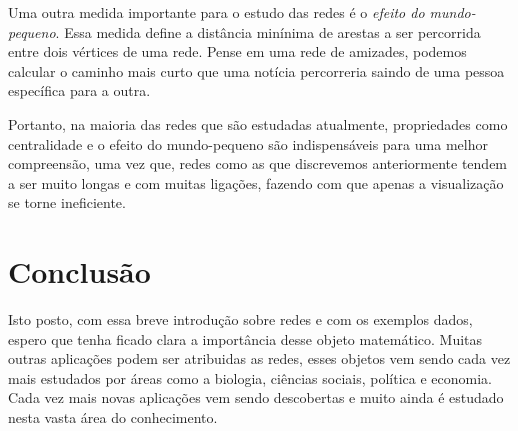 \documentclass{article}
\begin{document}
Uma outra medida importante para o estudo das redes é o \textit{efeito do mundo-pequeno}. Essa medida define a distância minínima de arestas a ser percorrida entre dois vértices de uma rede. Pense em uma rede de amizades, podemos calcular o caminho mais curto que uma notícia percorreria saindo de uma pessoa específica para a outra.


Portanto, na maioria das redes que são estudadas atualmente, propriedades como centralidade e o efeito do mundo-pequeno são indispensáveis para uma melhor compreensão, uma vez que, redes como as que discrevemos anteriormente tendem a ser muito longas e com muitas ligações, fazendo com que apenas a visualização se torne ineficiente.


\section{Conclusão}


Isto posto, com essa breve introdução sobre redes e com os exemplos dados, espero que tenha ficado clara a importância desse objeto matemático. Muitas outras aplicações podem ser atribuidas as redes, esses objetos vem sendo cada vez mais estudados por áreas como a biologia, ciências sociais, política e economia. Cada vez mais novas aplicações vem sendo descobertas e muito ainda é estudado nesta vasta área do conhecimento.
\end{document}
